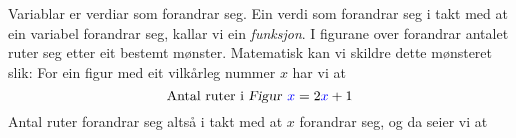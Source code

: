 





\newpage
\section{\fintro}
Variablar er verdiar som forandrar seg. Ein verdi som forandrar seg i takt med at ein variabel forandrar seg, kallar vi ein \textit{funksjon}.\vsk
{}
I figurane over forandrar antalet ruter seg etter eit bestemt mønster. Matematisk kan vi skildre dette mønsteret slik:
For ein figur med eit vilkårleg nummer $ x $ har vi at
\[ \text{Antal ruter i \textsl{Figur }}{\color{blue}x}=2{\color{blue}x}+1 \]
Antal ruter forandrar seg altså i takt med at $ x $ forandrar seg, og da seier vi at\regv
\st{}\regv

